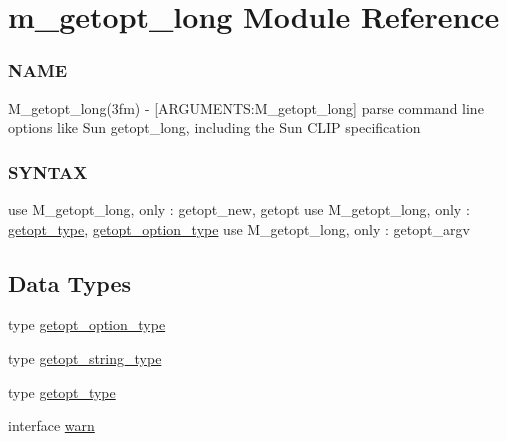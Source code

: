 \hypertarget{namespacem__getopt__long}{}\section{m\+\_\+getopt\+\_\+long Module Reference}
\label{namespacem__getopt__long}


\subsubsection*{N\+A\+ME}

M\+\_\+getopt\+\_\+long(3fm) -\/ \mbox{[}A\+R\+G\+U\+M\+E\+N\+TS\+:M\+\_\+getopt\+\_\+long\mbox{]} parse command line options like Sun getopt\+\_\+long, including the Sun C\+L\+IP specification \subsubsection*{S\+Y\+N\+T\+AX}

use M\+\_\+getopt\+\_\+long, only \+: getopt\+\_\+new, getopt use M\+\_\+getopt\+\_\+long, only \+: \hyperlink{structm__getopt__long_1_1getopt__type}{getopt\+\_\+type}, \hyperlink{structm__getopt__long_1_1getopt__option__type}{getopt\+\_\+option\+\_\+type} use M\+\_\+getopt\+\_\+long, only \+: getopt\+\_\+argv  


\subsection*{Data Types}
\begin{DoxyCompactItemize}
\item 
type \hyperlink{structm__getopt__long_1_1getopt__option__type}{getopt\+\_\+option\+\_\+type}
\item 
type \hyperlink{structm__getopt__long_1_1getopt__string__type}{getopt\+\_\+string\+\_\+type}
\item 
type \hyperlink{structm__getopt__long_1_1getopt__type}{getopt\+\_\+type}
\item 
interface \hyperlink{interfacem__getopt__long_1_1warn}{warn}
\end{DoxyCompactItemize}
